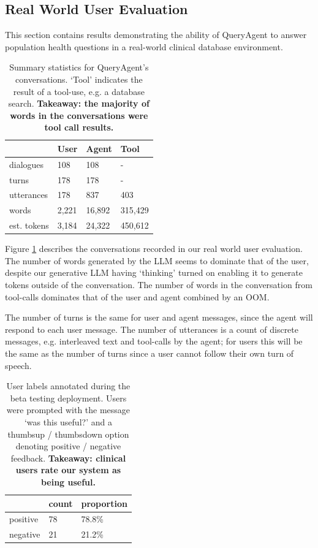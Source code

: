 \documentclass[11pt]{article}
\begin{document}
\subsection{Real World User Evaluation}
This section contains results demonstrating the ability of QueryAgent to answer population health questions in a real-world clinical database environment.

\begin{table}[ht]
\centering
\begin{tabular}{|l|l|l|l|}
\hline
	              & User & Agent & Tool \\
\hline
	dialogues	& 108 & 108    & -   \\
	turns       & 178 & 178    & -   \\
    utterances	& 178 & 837    & 403   \\
	words 		& 2,221 & 16,892 & 315,429 \\
	est. tokens	& 3,184 & 24,322 & 450,612\\
\hline
\end{tabular}
\caption{
Summary statistics for QueryAgent's conversations.
`Tool' indicates the result of a tool-use, e.g. a database search.
\textbf{Takeaway: the majority of words in the conversations were tool call results.}
}
\label{tab:conversation-statistics}
\end{table}

Figure \ref{tab:conversation-statistics} describes the conversations recorded in our real world user evaluation.
The number of words generated by the LLM seems to dominate that of the user, despite our generative LLM having `thinking' turned on enabling it to generate tokens outside of the conversation.
The number of words in the conversation from tool-calls dominates that of the user and agent combined by an OOM.

The number of turns is the same for user and agent messages, since the agent will respond to each user message.
The number of utterances is a count of discrete messages, e.g. interleaved text and tool-calls by the agent; for users this will be the same as the number of turns since a user cannot follow their own turn of speech.

\begin{table}[ht]
\centering
\begin{tabular}{|l|l|l|}
\hline
	            & count &  proportion \\	
\hline
	positive 	& 78 & 78.8\%	\\
\hline
	negative 	& 21 & 21.2\%\\
\hline	
\end{tabular}
\caption{
	User labels annotated during the beta testing deployment.
	Users were prompted with the message `was this useful?' and a thumbsup / thumbsdown option denoting positive / negative feedback.
    \textbf{Takeaway: clinical users rate our system as being useful.}
}
\label{tab:user-feedback}
\end{table}
\end{document}
